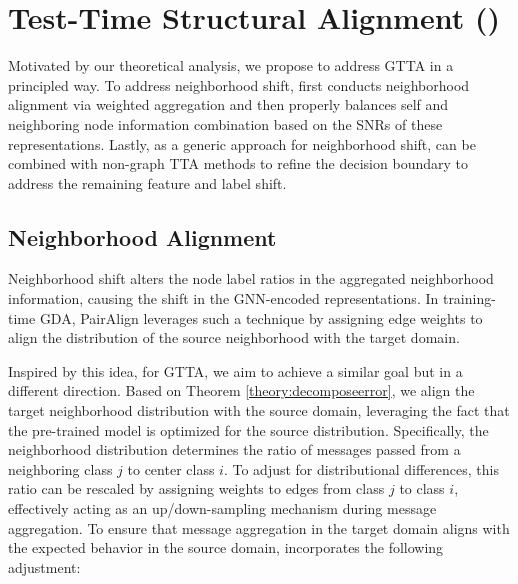 \section{Test-Time Structural Alignment  (\proj)}


Motivated by our theoretical analysis, we propose \proj to address GTTA in a principled way. %
To address neighborhood shift, \proj first conducts neighborhood alignment via weighted aggregation and then properly balances self and neighboring node information combination based on the SNRs of these representations. Lastly, as a generic approach for  neighborhood shift, \proj can be combined with non-graph TTA methods to refine the decision boundary to address the remaining feature and label shift. 



\subsection{Neighborhood Alignment}
\label{subsec:1stalign}


Neighborhood shift alters the node label ratios in the aggregated neighborhood information, causing the shift in the GNN-encoded representations. 
In training-time GDA, PairAlign \cite{liu2024pairwise} leverages such a technique by assigning edge weights to align the distribution of the source neighborhood with the target domain.


Inspired by this idea, for GTTA, we aim to achieve a similar goal but in a different direction. Based on Theorem \ref{theory:decomposeerror}, we align the target neighborhood distribution with the source domain, leveraging the fact that the pre-trained model is optimized for the source distribution. Specifically, the neighborhood distribution determines the ratio of messages passed from a neighboring class $j$ to center class $i$. To adjust for distributional differences, this ratio can be rescaled by assigning weights to edges from class $j$ to class $i$, effectively acting as an up/down-sampling mechanism during message aggregation. To ensure that message aggregation in the target domain aligns with the expected behavior in the source domain, \proj incorporates the following adjustment:










